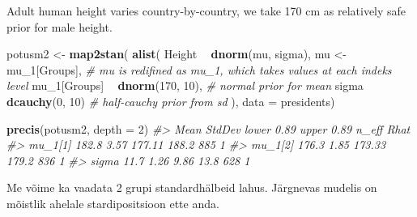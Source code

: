 \documentclass[]{book}
\newenvironment{Shaded}{\begin{snugshade}}{\end{snugshade}}
\newcommand{\CommentTok}[1]{\textcolor[rgb]{0.56,0.35,0.01}{\textit{#1}}}
\newcommand{\DataTypeTok}[1]{\textcolor[rgb]{0.13,0.29,0.53}{#1}}
\newcommand{\DecValTok}[1]{\textcolor[rgb]{0.00,0.00,0.81}{#1}}
\newcommand{\KeywordTok}[1]{\textcolor[rgb]{0.13,0.29,0.53}{\textbf{#1}}}
\newcommand{\NormalTok}[1]{#1}
\newcommand{\OperatorTok}[1]{\textcolor[rgb]{0.81,0.36,0.00}{\textbf{#1}}}
\newcommand{\StringTok}[1]{\textcolor[rgb]{0.31,0.60,0.02}{#1}}
\begin{document}
Adult human height varies country-by-country, we take 170 cm as relatively safe prior for male height.

\begin{Shaded}
\begin{Highlighting}[]
\NormalTok{potusm2 <-}\StringTok{ }\KeywordTok{map2stan}\NormalTok{(}
  \KeywordTok{alist}\NormalTok{(}
\NormalTok{    Height }\OperatorTok{~}\StringTok{ }\KeywordTok{dnorm}\NormalTok{(mu, sigma),}
\NormalTok{    mu <-}\StringTok{ }\NormalTok{mu_}\DecValTok{1}\NormalTok{[Groups], }\CommentTok{# mu is redifined as mu_1, which takes values at each indeks level}
\NormalTok{    mu_}\DecValTok{1}\NormalTok{[Groups] }\OperatorTok{~}\StringTok{ }\KeywordTok{dnorm}\NormalTok{(}\DecValTok{170}\NormalTok{, }\DecValTok{10}\NormalTok{), }\CommentTok{# normal prior for mean}
\NormalTok{    sigma }\OperatorTok{~}\StringTok{ }\KeywordTok{dcauchy}\NormalTok{(}\DecValTok{0}\NormalTok{, }\DecValTok{10}\NormalTok{) }\CommentTok{# half-cauchy prior from sd }
\NormalTok{  ),}
  \DataTypeTok{data =}\NormalTok{ presidents)}
\end{Highlighting}
\end{Shaded}

\begin{Shaded}
\begin{Highlighting}[]
\KeywordTok{precis}\NormalTok{(potusm2, }\DataTypeTok{depth =} \DecValTok{2}\NormalTok{)}
\CommentTok{#>          Mean StdDev lower 0.89 upper 0.89 n_eff Rhat}
\CommentTok{#> mu_1[1] 182.8   3.57     177.11      188.2   885    1}
\CommentTok{#> mu_1[2] 176.3   1.85     173.33      179.2   836    1}
\CommentTok{#> sigma    11.7   1.26       9.86       13.8   628    1}
\end{Highlighting}
\end{Shaded}

Me võime ka vaadata 2 grupi standardhälbeid lahus.
Järgnevas mudelis on mõistlik ahelale stardipositsioon ette anda.
\end{document}
